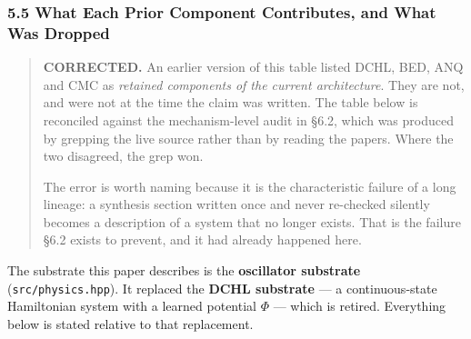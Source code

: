 \documentclass[
  11pt,
  a4paper,
]{article}
\begin{document}
\subsubsection{5.5 What Each Prior Component Contributes, and What Was
Dropped}\label{what-each-prior-component-contributes-and-what-was-dropped}

\begin{quote}
\textbf{CORRECTED.} An earlier version of this table listed DCHL, BED,
ANQ and CMC as \emph{retained components of the current architecture}.
They are not, and were not at the time the claim was written. The table
below is reconciled against the mechanism-level audit in §6.2, which was
produced by grepping the live source rather than by reading the papers.
Where the two disagreed, the grep won.

The error is worth naming because it is the characteristic failure of a
long lineage: a synthesis section written once and never re-checked
silently becomes a description of a system that no longer exists. That
is the failure §6.2 exists to prevent, and it had already happened here.
\end{quote}

The substrate this paper describes is the \textbf{oscillator substrate}
(\texttt{src/physics.hpp}). It replaced the \textbf{DCHL substrate} ---
a continuous-state Hamiltonian system with a learned potential \(\Phi\)
--- which is retired. Everything below is stated relative to that
replacement.
\end{document}
